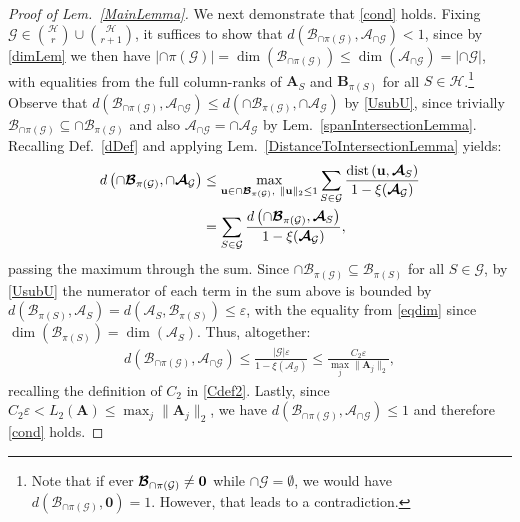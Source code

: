 \documentclass[journal, twocolumn]{IEEEtran}
\begin{document}
\begin{proof}[Proof of Lem.~\ref{MainLemma}]
We next demonstrate that \eqref{cond} holds. Fixing $\mathcal{G} \in {\mathcal{H} \choose r} \cup {\mathcal{H} \choose r+1}$, it suffices to show that $d(\bm{\mathcal{B}}_{\cap \pi(\mathcal{G})}, \bm{\mathcal{A}}_{\cap \mathcal{G}} ) < 1$, since by \eqref{dimLem} we then have $|\cap \pi(\mathcal{G})| = \dim(\bm{\mathcal{B}}_{\cap \pi(\mathcal{G})}) \leq \dim(\bm{\mathcal{A}}_{\cap \mathcal{G}}) = |\cap \mathcal{G}|$, with equalities from the full column-ranks of $\mathbf{A}_{S}$ and $\mathbf{B}_{\pi(S)}$ for all $S \in \mathcal{H}$.\footnote{Note that if ever $\bm{\mathcal{B}}_{\cap \pi(\mathcal{G})} \neq \bf 0$ while $\cap \mathcal{G} = \emptyset$, we would have $d(\bm{\mathcal{B}}_{\cap \pi(\mathcal{G})}, \bm 0 ) = 1$. However, that leads to a contradiction.} Observe that $d(\bm{\mathcal{B}}_{\cap \pi(\mathcal{G})}, \bm{\mathcal{A}}_{\cap \mathcal{G}}  ) 
\leq d\left( \cap \bm{\mathcal{B}}_{\pi(\mathcal{G})}, \cap \bm{\mathcal{A}}_\mathcal{G} \right)$ by \eqref{UsubU}, since trivially $\bm{\mathcal{B}}_{\cap \pi(\mathcal{G})} \subseteq \cap \bm{\mathcal{B}}_{\pi(\mathcal{G})}$ and also $\bm{\mathcal{A}}_{\cap \mathcal{G}} = \cap \bm{\mathcal{A}}_\mathcal{G}$ by Lem.~\ref{spanIntersectionLemma}. Recalling Def.~\ref{dDef} and applying Lem.~\ref{DistanceToIntersectionLemma} yields:
\begin{align}
d\left( \cap \bm{\mathcal{B}}_{\pi(\mathcal{G})}, \cap \bm{\mathcal{A}}_\mathcal{G} \right)
&\leq \max_{\mathbf{u} \in \cap \bm{\mathcal{B}}_{\pi(\mathcal{G})}, \ \|\mathbf{u}\|_2 \leq 1} \sum_{S \in \mathcal{G}} \frac{ \text{\rm dist}\left( \mathbf{u},\bm{\mathcal{A}}_{S} \right) }{ 1 - \xi( \bm{\mathcal{A}}_\mathcal{G} ) } \nonumber \\
&= \sum_{S \in \mathcal{G}} \frac{ d\left( \cap \bm{\mathcal{B}}_{\pi(\mathcal{G})},\bm{\mathcal{A}}_{S} \right) }{ 1 - \xi( \bm{\mathcal{A}}_\mathcal{G} ) }, \nonumber
\end{align}
passing the maximum through the sum.
Since $\cap \bm{\mathcal{B}}_{\pi(\mathcal{G})} \subseteq \bm{\mathcal{B}}_{\pi(S)}$ for all $S \in \mathcal{G}$, by \eqref{UsubU} the numerator of each term in the sum above is bounded by \mbox{$d\left( \bm{\mathcal{B}}_{\pi(S)},\bm{\mathcal{A}}_{S} \right) = d\left(\bm{\mathcal{A}}_{S}, \bm{\mathcal{B}}_{\pi(S)} \right) \leq \varepsilon$}, with the equality from \eqref{eqdim} since $\dim(\bm{\mathcal{B}}_{\pi(S)}) = \dim(\bm{\mathcal{A}}_S)$. Thus, altogether:
\begin{align}\label{last}
d(\bm{\mathcal{B}}_{\cap \pi(\mathcal{G})}, \bm{\mathcal{A}}_{\cap \mathcal{G}} )
\leq \frac{|\mathcal{G}| \varepsilon}{1 - \xi( \bm{\mathcal{A}}_\mathcal{G} )}
\leq \frac{C_2 \varepsilon}{\max_j\|\mathbf{A}_j\|_2},
\end{align}
recalling the definition of $C_2$ in \eqref{Cdef2}. Lastly, since $C_2 \varepsilon < L_2(\mathbf{A}) \leq \max_j\|\mathbf{A}_j\|_2$, we have $d(\bm{\mathcal{B}}_{\cap \pi(\mathcal{G})}, \bm{\mathcal{A}}_{\cap \mathcal{G}} ) \leq 1$ and therefore \eqref{cond} holds.


\end{proof}
\end{document}
